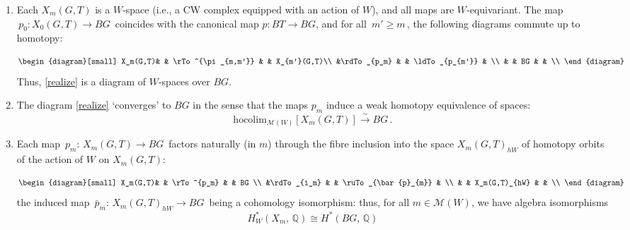 \documentclass[11pt]{amsart}
\theoremstyle{definition}
\theoremstyle{remark}
\numberwithin{equation}{section}
\newcommand{\la}{\label}
\def\M{\mathcal{M}}
\def\Q{\mathbb{Q}}
\begin{document}
\vspace{1ex}

\begin{enumerate}
  \item[(QI$_{1}$)]  Each $X_m(G,T) $ is a $W$-space (i.e., a CW complex equipped with an action of $W$), and all maps are $W$-equivariant. The map $\, p_0: X_0(G,T) \to BG \,$ coincides with the canonical map $ p: BT \to BG $, and for all $\, m' \ge m \,$, the following diagrams commute up to homotopy:

               $$ \begin{diagram}[small] 
                X_m(G,T)& & \rTo^{\pi_{m,m'}} &           & X_{m'}(G,T)\\
                      &\rdTo_{p_m}  &               & \ldTo_{p_{m'}}     & \\
                     &        &  BG         &           & \\
               \end{diagram}  
              $$
%
Thus, \eqref{realize} is a diagram of $W$-spaces  over $BG$.

\vspace{1ex}

\item[(QI$_{2}$)]
The diagram \eqref{realize} `converges' to $BG$ in the sense that the maps $p_m$ 
induce a weak homotopy equivalence of spaces:
%
\begin{equation*} 
\la{converge} 
\mathrm{hocolim}_{\M(W)}[X_m(G,T)] \stackrel{\sim}{\to} BG \, .
\end{equation*}
%

\item[(QI$_{3}$)] Each map $\, p_m:\, X_m(G,T) \to BG \,$ factors naturally (in $m$) through the fibre inclusion into the space $ X_m(G,T)_{hW} $ of homotopy orbits of the action of $W$ on $ X_m(G,T) $:

$$ \begin{diagram}[small] 
                X_m(G,T)& & \rTo^{p_m} &           & BG \\
                      &\rdTo_{i_m}  &               & \ruTo_{\bar{p}_{m}}     & \\
                     &        &    X_m(G,T)_{hW}       &           & \\
               \end{diagram}  
              $$
the induced map $\, \bar{p}_m:\, X_m(G,T)_{hW} \to BG \,$ being a cohomology isomorphism: thus, for all $ m \in \M(W) $,
we have algebra isomorphisms
%
$$
H_W^*(X_m,\,\Q) \cong H^*(BG,\, \Q) 
$$
%


\end{enumerate}
\end{document}
